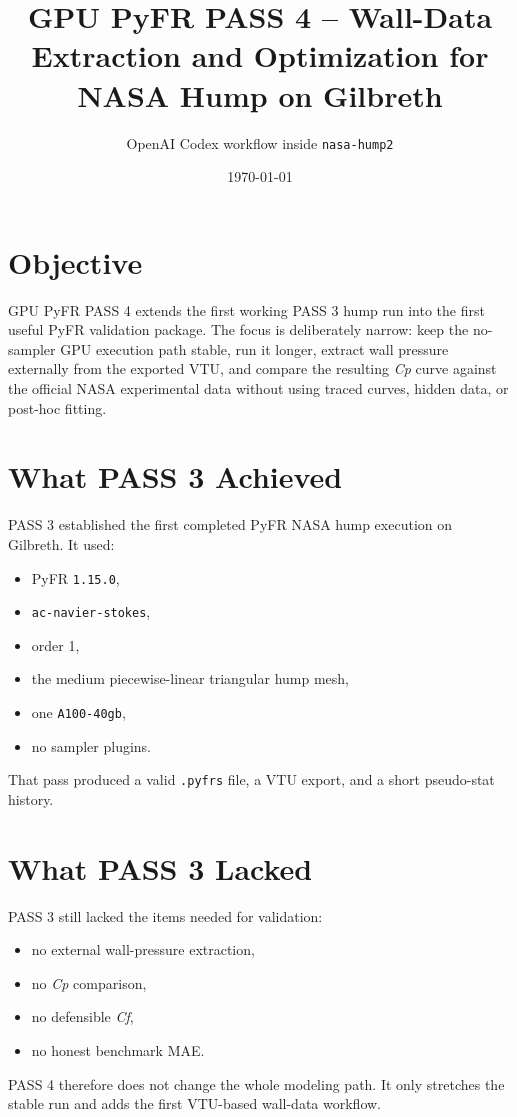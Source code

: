 \documentclass[11pt]{article}
\title{GPU PyFR PASS 4 -- Wall-Data Extraction and Optimization for NASA Hump on Gilbreth}
\author{OpenAI Codex workflow inside \texttt{nasa-hump2}}
\date{\today}
\begin{document}
\maketitle

\section{Objective}
GPU PyFR PASS 4 extends the first working PASS 3 hump run into the first useful PyFR validation package. The focus is deliberately narrow: keep the no-sampler GPU execution path stable, run it longer, extract wall pressure externally from the exported VTU, and compare the resulting \textit{Cp} curve against the official NASA experimental data without using traced curves, hidden data, or post-hoc fitting.

\section{What PASS 3 Achieved}
PASS 3 established the first completed PyFR NASA hump execution on Gilbreth. It used:
\begin{itemize}
  \item PyFR \texttt{1.15.0},
  \item \texttt{ac-navier-stokes},
  \item order 1,
  \item the medium piecewise-linear triangular hump mesh,
  \item one \texttt{A100-40gb},
  \item no sampler plugins.
\end{itemize}
That pass produced a valid \texttt{.pyfrs} file, a VTU export, and a short pseudo-stat history.

\section{What PASS 3 Lacked}
PASS 3 still lacked the items needed for validation:
\begin{itemize}
  \item no external wall-pressure extraction,
  \item no \textit{Cp} comparison,
  \item no defensible \textit{Cf},
  \item no honest benchmark MAE.
\end{itemize}
PASS 4 therefore does not change the whole modeling path. It only stretches the stable run and adds the first VTU-based wall-data workflow.
\end{document}
